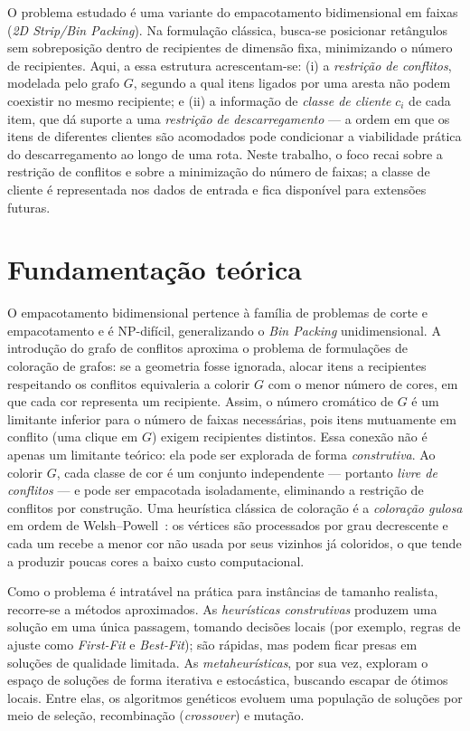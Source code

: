 \documentclass{report}
\begin{document}
O problema estudado é uma variante do empacotamento bidimensional em faixas
(\textit{2D Strip/Bin Packing}). Na formulação clássica, busca-se posicionar
retângulos sem sobreposição dentro de recipientes de dimensão fixa, minimizando
o número de recipientes. Aqui, a essa estrutura acrescentam-se: (i) a
\emph{restrição de conflitos}, modelada pelo grafo $G$, segundo a qual itens
ligados por uma aresta não podem coexistir no mesmo recipiente; e (ii) a
informação de \emph{classe de cliente} $c_i$ de cada item, que dá suporte a uma
\emph{restrição de descarregamento} --- a ordem em que os itens de diferentes
clientes são acomodados pode condicionar a viabilidade prática do descarregamento
ao longo de uma rota. Neste trabalho, o foco recai sobre a restrição de
conflitos e sobre a minimização do número de faixas; a classe de cliente é
representada nos dados de entrada e fica disponível para extensões futuras.

\chapter{Fundamentação teórica}
\label{sec:fundamentacao}

O empacotamento bidimensional pertence à família de problemas de corte e
empacotamento e é NP-difícil, generalizando o \textit{Bin Packing}
unidimensional. A introdução do grafo de conflitos aproxima o problema de
formulações de coloração de grafos: se a geometria fosse ignorada, alocar itens
a recipientes respeitando os conflitos equivaleria a colorir $G$ com o menor
número de cores, em que cada cor representa um recipiente. Assim, o número
cromático de $G$ é um limitante inferior para o número de faixas necessárias,
pois itens mutuamente em conflito (uma clique em $G$) exigem recipientes
distintos. Essa conexão não é apenas um limitante teórico: ela pode ser
explorada de forma \emph{construtiva}. Ao colorir $G$, cada classe de cor é um
conjunto independente --- portanto \emph{livre de conflitos} --- e pode ser
empacotada isoladamente, eliminando a restrição de conflitos por construção.
Uma heurística clássica de coloração é a \emph{coloração gulosa} em ordem de
Welsh--Powell~\cite{welsh1967}: os vértices são processados por grau
decrescente e cada um recebe a menor cor não usada por seus vizinhos já
coloridos, o que tende a produzir poucas cores a baixo custo computacional.

Como o problema é intratável na prática para instâncias de tamanho realista,
recorre-se a métodos aproximados. As \emph{heurísticas construtivas} produzem
uma solução em uma única passagem, tomando decisões locais (por exemplo, regras
de ajuste como \textit{First-Fit} e \textit{Best-Fit}); são rápidas, mas podem
ficar presas em soluções de qualidade limitada. As \emph{metaheurísticas}, por
sua vez, exploram o espaço de soluções de forma iterativa e estocástica,
buscando escapar de ótimos locais. Entre elas, os algoritmos genéticos evoluem
uma população de soluções por meio de seleção, recombinação (\textit{crossover})
e mutação.
\end{document}
